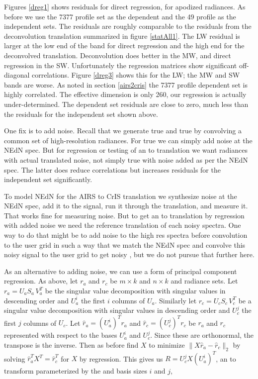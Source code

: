 \documentclass[10pt,twocolumn]{article}  %
\begin{document}
Figures \ref{dreg1} shows residuals for direct regression, for
apodized radiances.  As before we use the 7377 profile set as the
dependent and the 49 profile as the independent sets.  The residuals
are roughly comparable to the residuals from the deconvolution
translation summarized in figure \ref{statAll1}.  The LW residual is
larger at the low end of the band for direct regression and the high
end for the deconvolved translation.  Deconvolution does better in
the MW, and direct regression in the SW.   Unfortunately the
regression matrices show significant off-diagonal correlations.
Figure \ref{dreg3} shows this for the LW; the MW and SW bands are
worse.  As noted in section \ref{airs2cris} the 7377 profile
dependent set is highly correlated.  The effective dimension is only
260, our regression is actually under-determined.  The dependent set
residuals are close to zero, much less than the residuals for the
independent set shown above.

One fix is to add noise.  Recall that we generate true {\airs} 
and true {\cris} by convolving a common set of high-resolution
radiances.  For true {\airs} we can simply add noise at the {\airs}
NEdN spec.  But for regression or testing of an {\airs} to {\cris}
translation we want {\cris} radiances with actual translated {\airs}
noise, not simply true {\cris} with noise added as per the {\cris}
NEdN spec.  The latter does reduce correlations but increases
residuals for the independent set significantly.

To model NEdN for the AIRS to CrIS translation we synthesize noise
at the {\airs} NEdN spec, add it to the signal, run it through the
translation, and measure it.  That works fine for measuring noise.
But to get an {\airs} to {\cris} translation by regression with
added noise we need the reference translation of each noisy {\airs}
spectra.  One way to do that might be to add noise to the high res
spectra before convolution to the {\airs} user grid in such a way
that we match the {\airs} NEdN spec and convolve this noisy signal
to the {\cris} user grid to get noisy {\cris}, but we do not pursue
that further here.

As an alternative to adding noise, we can use a form of principal
component regression.  As above, let $r_a$ and $r_c$ be $m \times k$
and $n \times k$ {\airs} and {\cris} radiance sets.  Let $r_a = U_a
S_a\,V_a^T$ be the singular value decomposition with singular values
in descending order and $U_a^i$ the first $i$ columns of $U_a$.
Similarly let $r_c = U_c S_c\,V_c^T$ be a singular value
decomposition with singular values in descending order and $U_c^j$
the first $j$ columns of $U_c$.  Let $\hat r_a = (U_a^i)^T r_a$ and
$\hat r_c = (U_c^j)^T r_c$ be $r_a$ and $r_c$ represented with
respect to the bases $U_a^i$ and $U_c^j$.  Since these are
orthonormal, the transpose is the inverse.  Then as before find $X$
to minimize $\|X \hat r_a - \hat r_c\|_2$ by solving $\hat r_a^T X^T
= \hat r_c^T$ for $X$ by regression.  This gives us $R = U_c^j X
(U_a^i)^T$, an {\airs} to {\cris} transform parameterized by the
{\airs} and {\cris} basis sizes $i$ and $j$,
\end{document}
